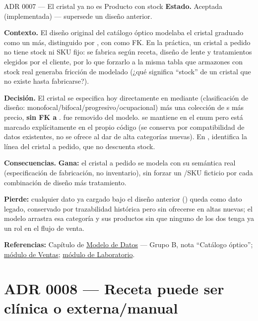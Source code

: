 \begin{cajaADR}{ADR 0007 --- El cristal ya no es Producto con stock}
\textbf{Estado.} Aceptada (implementada) --- supersede un diseño anterior.

\textbf{Contexto.} El diseño original del catálogo óptico modelaba el cristal graduado como un  más, distinguido por , con \allowbreak {} como FK. En la práctica, un cristal a pedido no tiene stock ni SKU fijo: se fabrica según receta, diseño de lente y tratamientos elegidos por el cliente, por lo que forzarlo a la misma tabla que armazones con stock real generaba fricción de modelado (¿qué significa ``stock'' de un cristal que no existe hasta fabricarse?).

\textbf{Decisión.} El cristal se especifica hoy directamente en  mediante  (clasificación de diseño: monofocal/bifocal/progresivo/ocupacional) más una colección de s más precio, \textbf{sin FK a }. \allowbreak {} fue removido del modelo. \allowbreak {} se mantiene en el enum pero está marcado \code{[Obsoleto]} explícitamente en el propio código (se conserva por compatibilidad de datos existentes, no se ofrece al dar de alta categorías nuevas). En , \allowbreak {} identifica la línea del cristal a pedido, que no descuenta stock.

\textbf{Consecuencias.} \textbf{Gana:} el cristal a pedido se modela con su semántica real (especificación de fabricación, no inventario), sin forzar un /SKU ficticio por cada combinación de diseño más tratamiento.

\textbf{Pierde:} cualquier dato ya cargado bajo el diseño anterior () queda como dato legado, conservado por trazabilidad histórica pero sin ofrecerse en altas nuevas; el modelo arrastra esa categoría y sus productos sin que ninguno de los dos tenga ya un rol en el flujo de venta.
\end{cajaADR}

\textbf{Referencias:} Capítulo de \hyperref[sec:modelo-datos]{Modelo de Datos} --- Grupo B, nota ``Catálogo óptico''; \hyperref[mod:08-ventas]{módulo de Ventas}; \hyperref[mod:09-laboratorio]{módulo de Laboratorio}.

\section{ADR 0008 --- Receta puede ser clínica o externa/manual}
\label{adr:0008}

